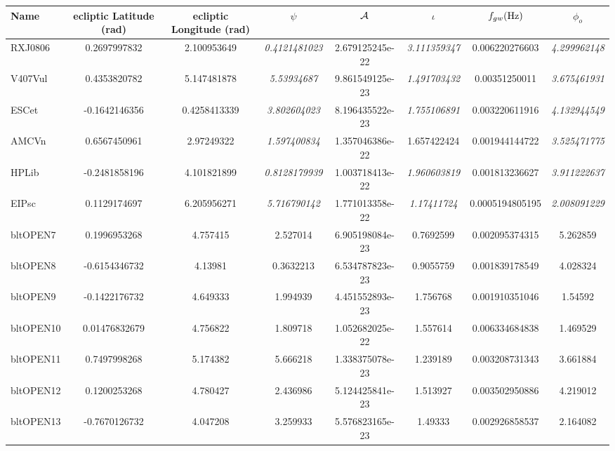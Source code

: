 \documentclass[11pt]{report}
\begin{document}
\begin{sidewaystable}
\centering
\small{
\begin{tabular}{|l|c|c|c|c|c|c|c|}
\hline \textbf{Name} & {\bf ecliptic Latitude (rad)} & {\bf ecliptic
Longitude (rad)} & $\psi$ & $\cal A$ &$\iota$ & $f_{gw} ({\rm Hz})$ &
$\phi_{o}$ \\
\hline 
RXJ0806   & 0.2697997832   &  2.100953649   & \emph{0.4121481023}   & 2.679125245e-22   &  \emph{3.111359347}   &  0.006220276603   &  \emph{4.299962148}\\
V407Vul   & 0.4353820782   &  5.147481878   &   \emph{5.53934687}   & 9.861549125e-23   &  \emph{1.491703432}   & 0.00351250011   &  \emph{3.675461931}\\
ESCet   & -0.1642146356   & 0.4258413339   &  \emph{3.802604023}   & 8.196435522e-23   &  \emph{1.755106891}   &  0.003220611916   &  \emph{4.132944549}\\
AMCVn   & 0.6567450961   &   2.97249322   &  \emph{1.597400834}   & 1.357046386e-22   &  1.657422424   &  0.001944144722   &  \emph{3.525471775}\\
HPLib   & -0.2481858196   &  4.101821899   & \emph{0.8128179939}   & 1.003718413e-22   &  \emph{1.960603819}   &  0.001813236627   &  \emph{3.911222637}\\
EIPsc   & 0.1129174697   &  6.205956271   &  \emph{5.716790142}   & 1.771013358e-22   &   \emph{1.17411724}   & 0.0005194805195   &  \emph{2.008091229}\\
\hline
bltOPEN7   & 0.1996953268   &     4.757415   &     2.527014   & 6.905198084e-23   &    0.7692599   &  0.002095374315   &     5.262859\\
bltOPEN8   & -0.6154346732   &      4.13981   &    0.3632213   & 6.534787823e-23   &    0.9055759   &  0.001839178549   &     4.028324\\
bltOPEN9   & -0.1422176732   &     4.649333   &     1.994939   & 4.451552893e-23   &     1.756768   &  0.001910351046   &      1.54592\\
bltOPEN10   & 0.01476832679   &     4.756822   &     1.809718   & 1.052682025e-22   &     1.557614   &  0.006334684838   &     1.469529\\
bltOPEN11   & 0.7497998268   &     5.174382   &     5.666218   & 1.338375078e-23   &     1.239189   &  0.003208731343   &     3.661884\\
bltOPEN12   & 0.1200253268   &     4.780427   &     2.436986   & 5.124425841e-23   &     1.513927   &  0.003502950886   &     4.219012\\
bltOPEN13   & -0.7670126732   &     4.047208   &     3.259933   & 5.576823165e-23   &      1.49333   &  0.002926858537   &     2.164082\\

\end{tabular}}
\end{sidewaystable}
\end{document}

